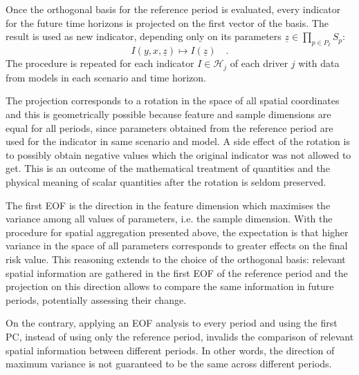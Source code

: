 Once the orthogonal basis for the reference period is evaluated, every indicator for the future time horizons is projected on the first vector of the basis. The result is used as new indicator, depending only on its parameters $\underline{z} \in \prod_{p \in P_I} S_p$:
\begin{equation}
  \label{eq:spatial_aggregation}
  I(y, x, \underline{z}) \mapsto I(\underline{z})%
  \quad .
\end{equation}
The procedure is repeated for each indicator $I \in \mathcal{H}_j$ of each \gls{driver} $j$ with data from models in each scenario and time horizon.

The projection corresponds to a rotation in the space of all spatial coordinates and this is geometrically possible because feature and sample dimensions are equal for all periods, since parameters obtained from the reference period are used for the indicator in same scenario and model. A side effect of the rotation is to possibly obtain negative values which the original indicator was not allowed to get. This is an outcome of the mathematical treatment of quantities and the physical meaning of scalar quantities after the rotation is seldom preserved.

The first \gls{EOF} is the direction in the feature dimension which maximises the variance among all values of parameters, i.e. the sample dimension. With the procedure for spatial aggregation presented above, the expectation is that higher variance in the space of all parameters corresponds to greater effects on the final \gls{risk} value. This reasoning extends to the choice of the orthogonal basis: relevant spatial information are gathered in the first \gls{EOF} of the reference period and the projection on this direction allows to compare the same information in future periods, potentially assessing their change.

On the contrary, applying an \gls{EOF} analysis to every period and using the first \gls{PC}, instead of using only the reference period, invalids the comparison of relevant spatial information between different periods. In other words, the direction of maximum variance is not guaranteed to be the same across different periods.

